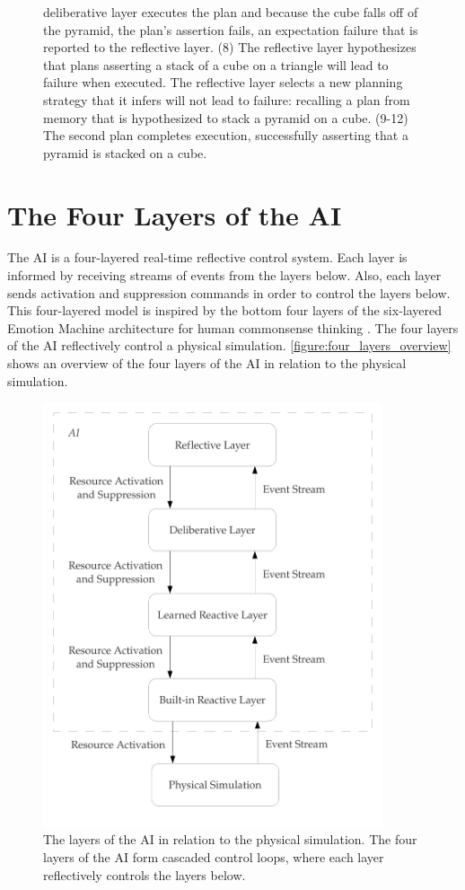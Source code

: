 \begin{figure}
{  deliberative layer executes the plan and because the cube falls off
  of the pyramid, the plan's assertion fails, an expectation failure
  that is reported to the reflective layer.  (8) The reflective layer
  hypothesizes that plans asserting a stack of a cube on a triangle
  will lead to failure when executed.  The reflective layer selects a
  new planning strategy that it infers will not lead to failure:
  recalling a plan from memory that is hypothesized to stack a pyramid
  on a cube.  (9-12) The second plan completes execution, successfully
  asserting that a pyramid is stacked on a cube.}
\label{figure:implemented_example_learning_storyboard}
\end{figure}

\section{The Four Layers of the AI}

The AI is a four-layered real-time reflective control system.  Each
layer is informed by receiving streams of events from the layers
below.  Also, each layer sends activation and suppression commands in
order to control the layers below.  This four-layered model is
inspired by the bottom four layers of the six-layered Emotion Machine
architecture for human commonsense thinking \cite[]{minsky:2006}.  The
four layers of the AI reflectively control a physical simulation.
{\mbox{\autoref{figure:four_layers_overview}}} shows an overview of
the four layers of the AI in relation to the physical simulation.
\begin{figure}
\begin{center}
\includegraphics[width=10cm]{gfx/four_layers_overview}
\end{center}
\caption[The four layers of the AI in relation to the physical
  simulation.]{The layers of the AI in relation to the physical
  simulation.  The four layers of the AI form cascaded control loops,
  where each layer reflectively controls the layers below.}
\label{figure:four_layers_overview}
\end{figure}

